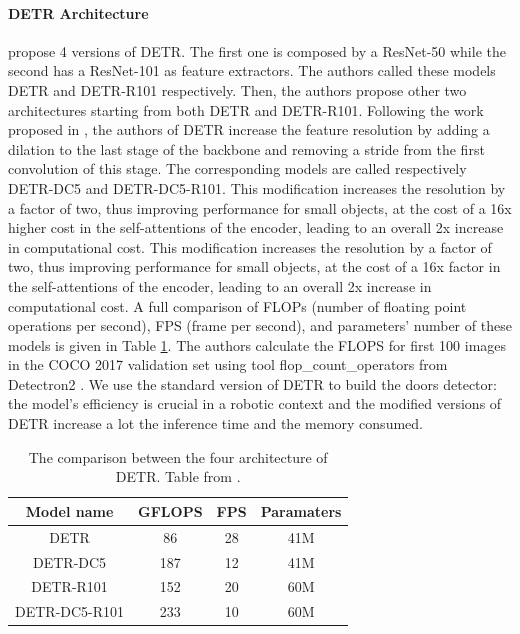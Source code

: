 \paragraph{DETR Architecture}
\citeauthor{detr} \cite{detr} propose 4 versions of DETR. The first one is composed by a ResNet-50 while the second has a ResNet-101 as feature extractors. The authors called these models DETR and DETR-R101 respectively. Then, the authors propose other two architectures starting from both DETR and DETR-R101. Following the work proposed in \cite{fullyconvolutional}, the authors of DETR increase the feature resolution by
adding a dilation to the last stage of the backbone and removing a stride from
the first convolution of this stage. The corresponding models are called respectively DETR-DC5 and DETR-DC5-R101. This modification
increases the resolution by a factor of two, thus improving performance for small
objects, at the cost of a 16x higher cost in the self-attentions of the encoder,
leading to an overall 2x increase in computational cost. This modification
increases the resolution by a factor of two, thus improving performance for small
objects, at the cost of a 16x factor in the self-attentions of the encoder,
leading to an overall 2x increase in computational cost. A full comparison of
FLOPs (number of floating point operations per second), FPS (frame per second), and parameters' number of these models is given in Table \ref{tab:detr_models_flops}. The authors calculate the FLOPS for first 100 images in the COCO 2017 validation set using tool \textsf{flop\_count\_operators} from Detectron2 \cite{detectron2}. We use the standard version of DETR to build the doors detector: the model's efficiency is crucial in a robotic context and the modified versions of DETR increase a lot the inference time and the memory consumed. 

\begin{table}[h!]
	\centering
	\begin{tabular}{cccc}
		
		\toprule
		\textbf{Model name} & \textbf{GFLOPS} & \textbf{FPS} & \textbf{Paramaters} \tabularnewline
		\midrule
		DETR & 86 & 28 & 41M\tabularnewline
		DETR-DC5 & 187 & 12 & 41M\tabularnewline
		DETR-R101 & 152 & 20 & 60M\tabularnewline
		DETR-DC5-R101 & 233 & 10 & 60M\tabularnewline
		\bottomrule
	\end{tabular}
	\caption{The comparison between the four architecture of DETR. Table from \cite{detr}.}
	\label{tab:detr_models_flops}
\end{table}

